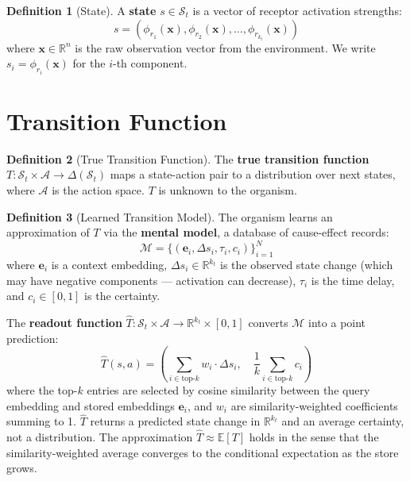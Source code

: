 \documentclass[12pt]{article}
\theoremstyle{definition}
\newtheorem{definition}{Definition}
\begin{document}
\begin{definition}[State]
A \textbf{state} $s \in \mathcal{S}_t$ is a vector of receptor activation strengths:
\[
s = (\phi_{r_1}(\mathbf{x}), \phi_{r_2}(\mathbf{x}), \ldots, \phi_{r_{k_t}}(\mathbf{x}))
\]
where $\mathbf{x} \in \mathbb{R}^n$ is the raw observation vector from the environment.
We write $s_i = \phi_{r_i}(\mathbf{x})$ for the $i$-th component.
\end{definition}

\section{Transition Function}

\begin{definition}[True Transition Function]
The \textbf{true transition function} $T : \mathcal{S}_t \times \mathcal{A} \to \Delta(\mathcal{S}_t)$
maps a state-action pair to a distribution over next states, where $\mathcal{A}$ is the
action space. $T$ is unknown to the organism.
\end{definition}

\begin{definition}[Learned Transition Model]
The organism learns an approximation of $T$ via the \textbf{mental model}, a database of
cause-effect records:
\[
\mathcal{M} = \{(\mathbf{e}_i, \Delta s_i, \tau_i, c_i)\}_{i=1}^{N}
\]
where $\mathbf{e}_i$ is a context embedding, $\Delta s_i \in \mathbb{R}^{k_t}$ is the
observed state change (which may have negative components --- activation can decrease),
$\tau_i$ is the time delay, and $c_i \in [0,1]$ is the certainty.

The \textbf{readout function} $\hat{T} : \mathcal{S}_t \times \mathcal{A} \to \mathbb{R}^{k_t} \times [0,1]$
converts $\mathcal{M}$ into a point prediction:
\[
\hat{T}(s, a) = \left(\sum_{i \in \text{top-}k} w_i \cdot \Delta s_i, \quad
\frac{1}{k}\sum_{i \in \text{top-}k} c_i\right)
\]
where the top-$k$ entries are selected by cosine similarity between the query embedding
and stored embeddings $\mathbf{e}_i$, and $w_i$ are similarity-weighted coefficients
summing to 1. $\hat{T}$ returns a predicted state change in $\mathbb{R}^{k_t}$ and an
average certainty, not a distribution. The approximation $\hat{T} \approx \mathbb{E}[T]$
holds in the sense that the similarity-weighted average converges to the conditional
expectation as the store grows.
\end{definition}
\end{document}
